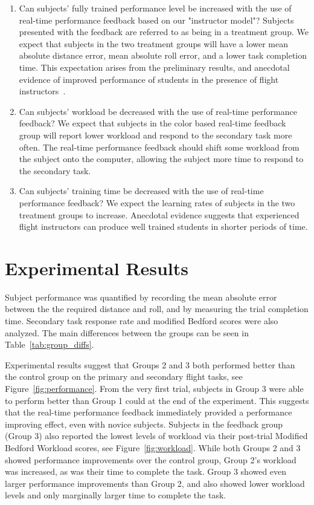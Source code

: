 \documentclass[]{aiaa-tc}%
\begin{document}
\begin{enumerate}
  \itemsep0em
  \item Can subjects' fully trained performance level be increased with the use of real-time performance feedback based on our "instructor model"? Subjects presented with the feedback are referred to as being in a treatment group. We expect that subjects in the two treatment groups will have a lower mean absolute distance error, mean absolute roll error, and a lower task completion time. This expectation arises from the preliminary results, and anecdotal evidence of improved performance of students in the presence of flight instructors~\cite{karasinski2016development}.
  \item Can subjects' workload be decreased with the use of real-time performance feedback? We expect that subjects in the color based real-time feedback group will report lower workload and respond to the secondary task more often. The real-time performance feedback should shift some workload from the subject onto the computer, allowing the subject more time to respond to the secondary task.
  \item Can subjects' training time be decreased with the use of real-time performance feedback? We expect the learning rates of subjects in the two treatment groups to increase. Anecdotal evidence suggests that experienced flight instructors can produce well trained students in shorter periods of time.
\end{enumerate}

\section{Experimental Results}
Subject performance was quantified by recording the mean absolute error between the the required distance and roll, and by measuring the trial completion time. Secondary task response rate and modified Bedford scores were also analyzed. The main differences between the groups can be seen in Table~\ref{tab:group_diffs}.

Experimental results suggest that Groups 2 and 3 both performed better than the control group on the primary and secondary flight tasks, see Figure~\ref{fig:performance}. From the very first trial, subjects in Group 3 were able to perform better than Group 1 could at the end of the experiment. This suggests that the real-time performance feedback immediately provided a performance improving effect, even with novice subjects. Subjects in the feedback group (Group 3) also reported the lowest levels of workload via their post-trial Modified Bedford Workload scores, see Figure~\ref{fig:workload}. While both Groups 2 and 3 showed performance improvements over the control group, Group 2's workload was increased, as was their time to complete the task. Group 3 showed even larger performance improvements than Group 2, and also showed lower workload levels and only marginally larger time to complete the task.
\end{document}
